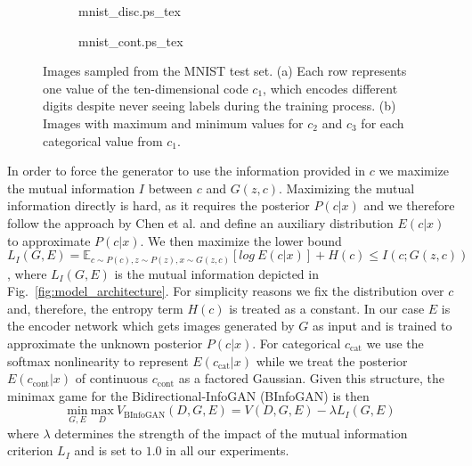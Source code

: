 \documentclass{esannV2}
\begin{document}
\begin{figure}
\centering
\begin{subfigure}[b]{0.8\textwidth}
\begin{footnotesize}
\def\svgwidth{\linewidth}
\def\svgscale{0.5}
{mnist_disc.ps_tex}
\end{footnotesize}
\vspace{-0.6cm}
\caption{}
\label{fig:mnist:discrete}
\end{subfigure}

\begin{subfigure}[b]{0.8\textwidth}
\begin{footnotesize}
\def\svgwidth{\linewidth}
\def\svgscale{0.5}
{mnist_cont.ps_tex}
\end{footnotesize}
\vspace{-0.4cm}
\caption{}
\label{fig:mnist:continuous}
\end{subfigure}

\caption{Images sampled from the MNIST test set. (a) Each row represents one value of the ten-dimensional code $c_1$, which encodes different digits despite never seeing labels during the training process. (b) Images with maximum and minimum values for $c_2$ and $c_3$ for each categorical value from $c_1$.}
\vspace{-0.3cm}
\label{fig:mnist}
\end{figure}

In order to force the generator to use the information provided in $c$ we maximize the mutual information $I$ between $c$ and $G(z,c)$. Maximizing the mutual information directly is hard, as it requires the posterior $P(c\vert x)$ and we therefore follow the approach by Chen et al. \cite{Chen2016} and define an auxiliary distribution $E(c\vert x)$ to approximate $P(c\vert x)$. We then maximize the lower bound $L_I(G, E) = \mathbb{E}_{c\sim P(c), z\sim P(z), x\sim G(z,c)}[log\ E(c\vert x)]+H(c) \leq I(c;G(z,c))$, where $L_I(G, E)$ is the mutual information depicted in Fig.~\ref{fig:model_architecture}. For simplicity reasons we fix the distribution over $c$ and, therefore, the entropy term $H(c)$ is treated as a constant. In our case $E$ is the encoder network which gets images generated by $G$ as input and is trained to approximate the unknown posterior $P(c\vert x)$. For categorical $c_{\text{cat}}$ we use the softmax nonlinearity to represent $E(c_{\text{cat}}\vert x)$ while we treat the posterior $E(c_{\text{cont}}\vert x)$ of continuous $c_{\text{cont}}$ as a factored Gaussian. Given this structure, the minimax game for the Bidirectional-InfoGAN (BInfoGAN) is then
\[\underset{G, E}{\text{min}}\ \underset{D}{\text{max}}\ V_\text{BInfoGAN}(D, G, E) = V(D, G, E) - \lambda L_I(G, E)\]
where $\lambda$ determines the strength of the impact of the mutual information criterion $L_I$ and is set to $1.0$ in all our experiments.
\end{document}
